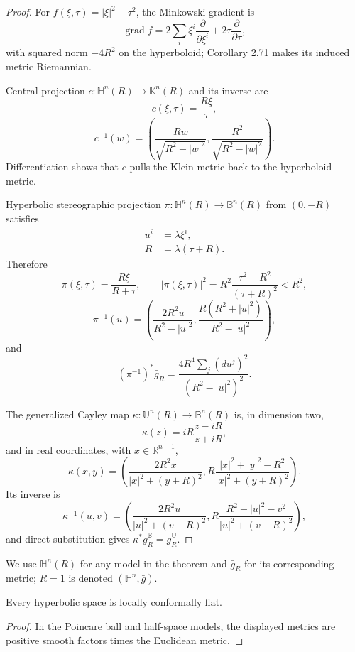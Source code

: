 \begin{proof}
\sketch For $f(\xi,\tau)=|\xi|^2-\tau^2$, the Minkowski gradient is
\begin{equation}
\operatorname{grad}f=2\sum_i\xi^i\frac{\partial}{\partial\xi^i}+2\tau\frac{\partial}{\partial\tau},\tag{3.10}
\end{equation}
with squared norm $-4R^2$ on the hyperboloid; Corollary 2.71 makes its induced metric Riemannian.

Central projection $c:\mathbb H^n(R)\to\mathbb K^n(R)$ and its inverse are
\[
c(\xi,\tau)=\frac{R\xi}{\tau},\tag{3.11}
\]
\[
c^{-1}(w)=\left(\frac{Rw}{\sqrt{R^2-|w|^2}},\frac{R^2}{\sqrt{R^2-|w|^2}}\right).\tag{3.12}
\]
Differentiation shows that $c$ pulls the Klein metric back to the hyperboloid metric.

Hyperbolic stereographic projection $\pi:\mathbb H^n(R)\to\mathbb B^n(R)$ from $(0,-R)$ satisfies
\begin{align}
u^i&=\lambda\xi^i,\label{eq:3.13a}\\
R&=\lambda(\tau+R).\label{eq:3.13b}
\end{align}
Therefore
\[
\pi(\xi,\tau)=\frac{R\xi}{R+\tau},\qquad
|\pi(\xi,\tau)|^2=R^2\frac{\tau^2-R^2}{(\tau+R)^2}<R^2,
\]
\[
\pi^{-1}(u)=\left(\frac{2R^2u}{R^2-|u|^2},\frac{R(R^2+|u|^2)}{R^2-|u|^2}\right),
\]
and
\[
(\pi^{-1})^*\bar g_R=\frac{4R^4\sum_j(du^j)^2}{(R^2-|u|^2)^2}.
\]

The generalized Cayley map $\kappa:\mathbb U^n(R)\to\mathbb B^n(R)$ is, in dimension two,
\begin{equation}
\kappa(z)=iR\frac{z-iR}{z+iR},\tag{3.14}
\end{equation}
and in real coordinates, with $x\in\mathbb R^{n-1}$,
\begin{equation}
\kappa(x,y)=\left(\frac{2R^2x}{|x|^2+(y+R)^2},R\frac{|x|^2+|y|^2-R^2}{|x|^2+(y+R)^2}\right).\tag{3.15}
\end{equation}
Its inverse is
\[
\kappa^{-1}(u,v)=\left(\frac{2R^2u}{|u|^2+(v-R)^2},R\frac{R^2-|u|^2-v^2}{|u|^2+(v-R)^2}\right),
\]
and direct substitution gives $\kappa^*\bar g_R^{\mathbb B}=\bar g_R^{\mathbb U}$.
\end{proof}

We use $\mathbb H^n(R)$ for any model in the theorem and $\bar g_R$ for its corresponding metric; $R=1$ is denoted $(\mathbb H^n,\bar g)$.

\begin{corollary}
\label{cor:hyperbolic-locally-conformally-flat}
Every hyperbolic space is locally conformally flat.
\end{corollary}
\begin{proof}
\sketch In the Poincare ball and half-space models, the displayed metrics are positive smooth factors times the Euclidean metric.
\end{proof}

